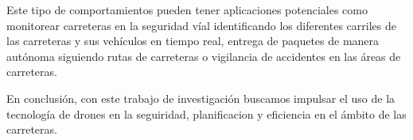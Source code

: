 Este tipo de comportamientos pueden tener aplicaciones potenciales como monitorear carreteras en la seguridad víal identificando los diferentes carriles de las carreteras y sus vehículos
en tiempo real, entrega de paquetes de manera autónoma siguiendo rutas de carreteras o vigilancia de accidentes en las áreas de carreteras. \newline

En conclusión, con este trabajo de investigación buscamos impulsar el uso de la tecnología de drones en la seguiridad, planificacion y eficiencia en el ámbito de las carreteras. 


